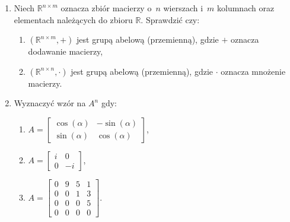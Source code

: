 \documentclass{article}
\begin{document}
\begin{enumerate}
\begin{enumerate}
        \item $A = \begin{bmatrix} 3 & -6 & -3\\  -4 & -11 & 2\\ -1 & 5 & 1 \end{bmatrix}$, $B = \begin{bmatrix} 0 & -2 & 7\\  -5 & -6 & 0\\ -5 & -5 & -6 \end{bmatrix}$, \\ $C = \begin{bmatrix} -2 & 5 & 0\\  -1 & 1 & 2\\ -1 & 8 & 2 \end{bmatrix}$, $D = \begin{bmatrix} 3 & 6 & 2 \end{bmatrix}$.
    \end{enumerate}

    \item Niech $\mathbb{R}^{n \times m}$ oznacza zbiór macierzy o~$n$ wierszach i~$m$ kolumnach oraz elementach należących do zbioru $\mathbb{R}$. Sprawdzić czy:
    \begin{enumerate}
    \item $( \mathbb{R}^{n \times m}, + )$ jest grupą abelową (przemienną), gdzie $+$ oznacza dodawanie macierzy,
    \item $( \mathbb{R}^{n \times n}, \cdot )$ jest grupą abelową (przemienną), gdzie $\cdot$ oznacza mnożenie macierzy.
    \end{enumerate}
    
    \item Wyznaczyć wzór na $A^{n}$ gdy:
    \begin{enumerate}
        \item $A = \begin{bmatrix} \cos(\alpha) & -\sin(\alpha)\\  \sin(\alpha) & \cos(\alpha) \end{bmatrix}$,
        \item $A = \begin{bmatrix} i & 0\\  0 & -i \end{bmatrix}$,
        \item $A = \begin{bmatrix} 0 & 9 & 5 & 1\\  0 & 0 & 1 & 3\\ 0 & 0 & 0 & 5\\ 0 & 0 & 0 & 0 \end{bmatrix}$.
    \end{enumerate}


\end{enumerate}
\end{document}
